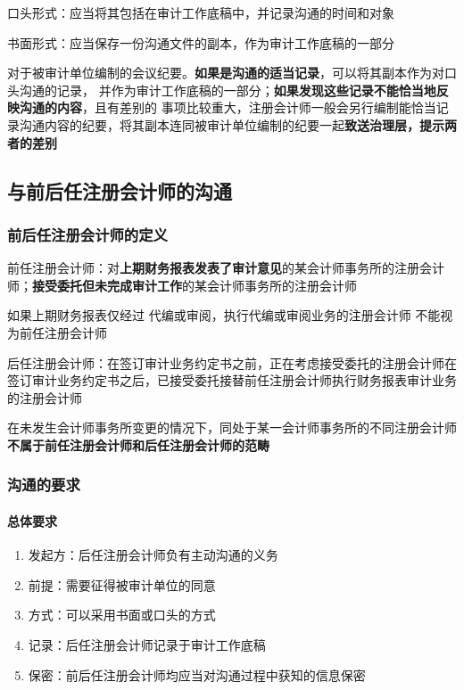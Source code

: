 \documentclass[UTF8,12pt]{ctexart}
\numberwithin{equation}{section} %
\numberwithin{figure}{section}
\numberwithin{table}{section}
\begin{document}
	口头形式：应当将其包括在审计工作底稿中，并记录沟通的时间和对象
	
	书面形式：应当保存一份沟通文件的副本，作为审计工作底稿的一部分
	
	对于被审计单位编制的会议纪要。\textbf{如果是沟通的适当记录}，可以将其副本作为对口头沟通的记录， 并作为审计工作底稿的一部分；\textbf{如果发现这些记录不能恰当地反映沟通的内容}，且有差别的 事项比较重大，注册会计师一般会另行编制能恰当记录沟通内容的纪要，将其副本连同被审计单位编制的纪要一起\textbf{致送治理层，提示两者的差别}
	
	\subsection{与前后任注册会计师的沟通}
	
	\subsubsection{前后任注册会计师的定义}
	前任注册会计师：对\textbf{上期财务报表发表了审计意见}的某会计师事务所的注册会计师；\textbf{接受委托但未完成审计工作}的某会计师事务所的注册会计师
	
	如果上期财务报表仅经过 代编或审阅，执行代编或审阅业务的注册会计师 不能视为前任注册会计师
	
	后任注册会计师：在签订审计业务约定书之前，正在考虑接受委托的注册会计师在签订审计业务约定书之后，已接受委托接替前任注册会计师执行财务报表审计业务的注册会计师
	
	 在未发生会计师事务所变更的情况下，同处于某一会计师事务所的不同注册会计师\textbf{不属于前任注册会计师和后任注册会计师的范畴}
	
	\subsubsection{沟通的要求}
	
	\paragraph{总体要求}
	\begin{enumerate}
		\item 发起方：后任注册会计师负有主动沟通的义务
		
		\item 前提：需要征得被审计单位的同意
		
		\item 方式：可以采用书面或口头的方式
		
		\item 记录：后任注册会计师记录于审计工作底稿
		
		\item 保密：前后任注册会计师均应当对沟通过程中获知的信息保密
	\end{enumerate}
	
\end{document}
